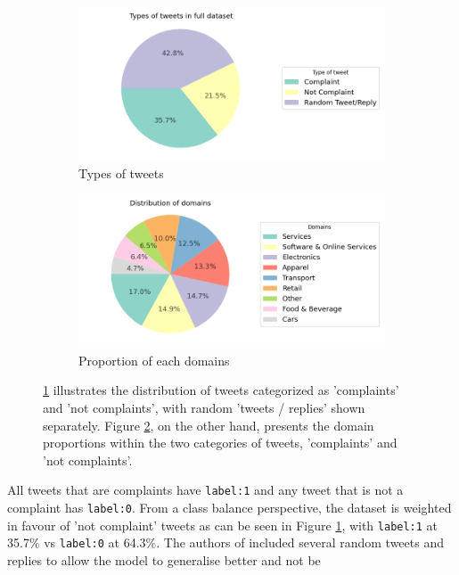 \begin{figure}[htbp]
    \centering
    \captionsetup{font=small}
    \begin{subfigure}{0.49\textwidth}
        \centering
        \includegraphics[width=\linewidth]{figures/compl_non_random_dist.png}
        \caption{Types of tweets}
        \label{fig: compl_non_random_dist}
    \end{subfigure}
    \hfill
    \begin{subfigure}{0.49\textwidth}
        \centering
        \includegraphics[width=\linewidth]{figures/domain_dist.png}
        \caption{Proportion of each domains}
        \label{fig: domain_dist}
    \end{subfigure}
    \caption{ \ref{fig: compl_non_random_dist} illustrates the distribution of tweets categorized as 'complaints' and 'not complaints', with random 'tweets / replies' shown separately. Figure \ref{fig: domain_dist}, on the other hand, presents the domain proportions within the two categories of tweets, 'complaints' and 'not complaints'.}
    \label{fig: compl_main_dist}
\end{figure}

All tweets that are complaints have \texttt{label:1} and any tweet that is not a complaint has \texttt{label:0}. From a class balance perspective, the dataset is weighted in favour of 'not complaint' tweets as can be seen in Figure \ref{fig: compl_non_random_dist}, with \texttt{label:1} at 35.7\% vs \texttt{label:0} at 64.3\%. The authors of \cite{preotiuc-pietro_automatically_2019} included several random tweets and replies to allow the model to generalise better and not be 

